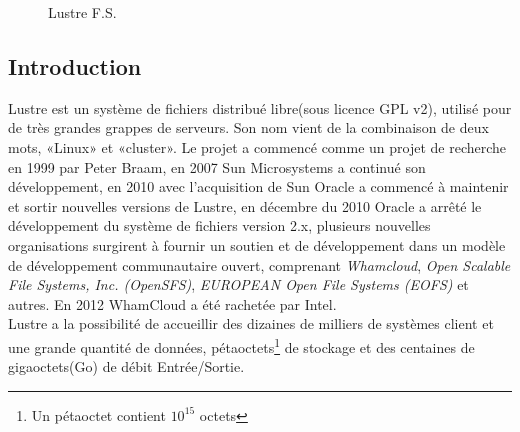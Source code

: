 \documentclass[12pt]{article}
\begin{document}
\begin{figure}[H] 
\caption{Lustre F.S.}
\label{fig:speciation}
\end{figure}

\subsection{Introduction}
Lustre est un système de fichiers distribué libre(sous licence GPL v2), utilisé pour de très grandes grappes de serveurs. Son nom vient de la combinaison de deux mots, «Linux» et «cluster». Le projet a commencé comme un projet de recherche en 1999 par Peter Braam, en 2007 Sun Microsystems a continué son développement, en 2010 avec l'acquisition de Sun Oracle a commencé à maintenir et sortir nouvelles versions de Lustre, en décembre du 2010 Oracle a arrêté le développement du système de fichiers version 2.x, plusieurs nouvelles organisations surgirent à fournir un soutien et de développement dans un modèle de développement communautaire ouvert, comprenant \textit{Whamcloud}, \textit{Open Scalable File Systems, Inc. (OpenSFS)}, \textit{EUROPEAN Open File Systems (EOFS)} et autres. En 2012 WhamCloud a été rachetée par Intel.\\


Lustre a la possibilité de accueillir des dizaines de milliers de systèmes client et une grande quantité de données, pétaoctets\footnote{Un pétaoctet contient \begin{math}10^{15}\end{math} octets} de stockage et des centaines de gigaoctets(Go) de débit Entrée/Sortie. 
\end{document}
